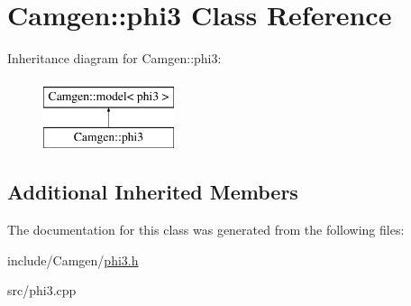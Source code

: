 \hypertarget{a00424}{}\section{Camgen\+:\+:phi3 Class Reference}
\label{a00424}
Inheritance diagram for Camgen\+:\+:phi3\+:\begin{figure}[H]
\begin{center}
\leavevmode
\includegraphics[height=2.000000cm]{a00424}
\end{center}
\end{figure}
\subsection*{Additional Inherited Members}


The documentation for this class was generated from the following files\+:\begin{DoxyCompactItemize}
\item 
include/\+Camgen/\hyperlink{a00719}{phi3.\+h}\item 
src/phi3.\+cpp\end{DoxyCompactItemize}
